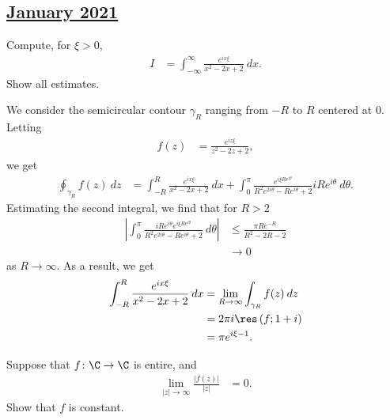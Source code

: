 \documentclass[10pt]{mypackage}
\begin{document}
\subsection{\href{https://math.virginia.edu/graduate/exams/analysis/2021Jan_complex.html}{January 2021}}%
\begin{problem}[Problem 1]
  Compute, for $\xi > 0$,
  \begin{align*}
    I &= \int_{-\infty}^{\infty} \frac{e^{ix\xi}}{x^2 - 2x + 2}\:dx.
  \end{align*}
  Show all estimates.
\end{problem}
\begin{solution}
  We consider the semicircular contour $\gamma_R$ ranging from $-R$ to $R$ centered at $0$. Letting
  \begin{align*}
    f(z) &= \frac{e^{iz\xi}}{z^2 - 2z + 2},
  \end{align*}
  we get
  \begin{align*}
    \oint_{\gamma_R}^{} f(z)\:dz &= \int_{-R}^{R} \frac{e^{ix\xi}}{x^2 - 2x + 2}\:dx + \int_{0}^{\pi} \frac{e^{i\xi Re^{i\theta}}}{R^2e^{2i\theta}-Re^{i\theta} + 2}iRe^{i\theta}\:d\theta.
  \end{align*}
  Estimating the second integral, we find that for $R > 2$
  \begin{align*}
    \left\vert \int_{0}^{\pi} \frac{iRe^{i\theta}e^{i\xi Re^{i\theta}}}{R^2e^{2i\theta}-Re^{i\theta} + 2}\:d\theta \right\vert &\leq \frac{\pi R e^{-R}}{R^2 - 2R - 2}\\
                                                                                                                                          &\rightarrow 0
  \end{align*}
  as $R\rightarrow\infty$. As a result, we get
  \begin{align*}
    \int_{-R}^{R} \frac{e^{ix\xi}}{x^2-2x+2}\:dx &= \lim_{R\rightarrow\infty} \int_{\gamma_R}^{} f(z)\:dz\\
                                                 &= 2\pi i \res\left( f;1+i \right)\\
                                                 &= \pi e^{i\xi-1}.
  \end{align*}
\end{solution}
\begin{problem}
  Suppose that $f\colon \C\rightarrow \C$ is entire, and
  \begin{align*}
    \lim_{|z|\rightarrow\infty} \frac{\left\vert f(z) \right\vert}{\left\vert z \right\vert} &= 0.
  \end{align*}
  Show that $f$ is constant.
\end{problem}
\end{document}
